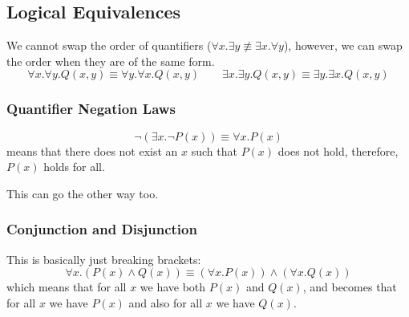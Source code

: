 \subsection{Logical Equivalences}\label{sub:logical_equivalences}

We cannot swap the order of quantifiers (\(\forall x . \exists y \not\equiv \exists x . \forall y\)), however, we can swap the order when they are of the same form.
\[
    \forall x . \forall y . Q(x, y) \equiv \forall y . \forall x . Q(x, y) \qquad \exists x . \exists y . Q(x, y) \equiv \exists y . \exists x . Q(x, y)
\]

\subsubsection{Quantifier Negation Laws}\label{ssub:quantifier_negation_laws}

\[
    \neg \left( \exists x . \neg P(x) \right) \equiv \forall x . P(x)
\]
means that there does not exist an \(x\) such that \(P(x)\) does not hold, therefore, \(P(x)\) holds for all.
\begin{note}
    This can go the other way too.
\end{note}

\subsubsection{Conjunction and Disjunction}\label{ssub:conjunction_and_disjunction}

This is basically just breaking brackets:
\[
    \forall x . \left( P(x) \land Q(x) \right) \equiv (\forall x . P(x)) \land (\forall x . Q(x))
\]
which means that for all \(x\) we have both \(P(x)\) and \(Q(x)\), and becomes that for all \(x\) we have \(P(x)\) and also for all \(x\) we have \(Q(x)\).
